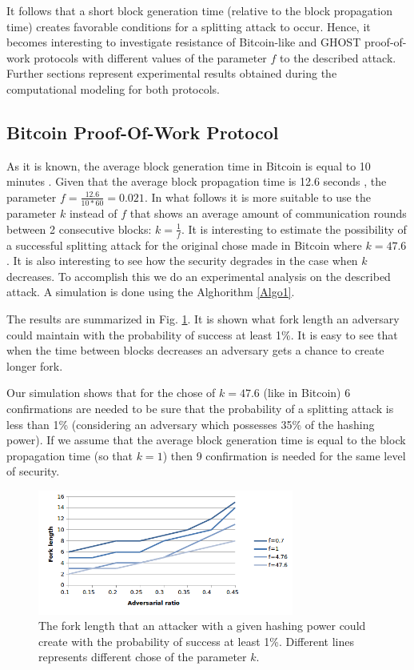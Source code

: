 \documentclass[10pt,a4paper]{article}
\numberwithin{equation}{section} %
\theoremstyle{plain}
\theoremstyle{definition}
\theoremstyle{remark}
\begin{document}
    It follows that a short block generation time (relative to the block propagation time) creates favorable conditions for a splitting attack to occur. Hence, it becomes interesting to investigate resistance of Bitcoin-like and GHOST proof-of-work protocols with different values of the parameter \(f\) to the described attack. Further sections represent experimental results obtained during the computational modeling for both protocols.
	
	\subsection{Bitcoin Proof-Of-Work Protocol}
	
	As it is known, the average block generation time in Bitcoin is equal to 10 minutes \cite{N08}. Given that the average block propagation time is 12.6 seconds \cite{DW13}, the parameter \(f=\frac{12.6}{10*60}=0.021\). In what follows it is more suitable to use the parameter \(k\) instead of \(f\) that shows an average amount of communication rounds between 2 consecutive blocks: \(k=\frac{1}{f}\).
	It is interesting to estimate the possibility of a successful splitting attack for the original chose made in Bitcoin where \(k=47.6\). It is also interesting to see how the security degrades in the case when \(k\) decreases. To accomplish this we do an experimental analysis on the described attack. A simulation is done using the Alghorithm \ref{Algo1}.
	
	The results are summarized in Fig. \ref{fig:btc_split_chart}. It is shown what fork length an adversary could maintain with the probability of success at least 1\%. It is easy to see that when the time between blocks decreases an adversary gets a chance to create longer fork. 
	
	Our simulation shows that for the chose of \(k=47.6\) (like in Bitcoin) 6 confirmations are needed to be sure that the probability of a splitting attack is less than 1\% (considering an adversary which possesses 35\% of the hashing power). If we assume that the average block generation time is equal to the block propagation time (so that \(k=1\)) then 9 confirmation is needed for the same level of security.   
	
	\begin{figure}[h]
        \centering
        \includegraphics[width=0.75\textwidth]{btc_split_chart}
        \caption{The fork length that an attacker with a given hashing power could create with the probability of success at least 1\%. Different lines represents different chose of the parameter \(k\).}
        \label{fig:btc_split_chart}
    \end{figure}
	
\end{document}
